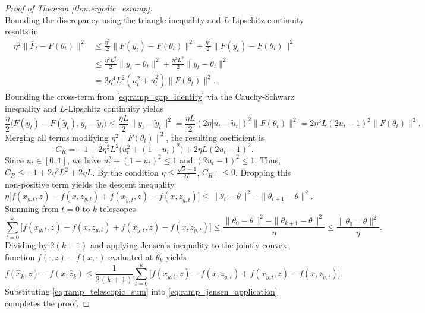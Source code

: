 \documentclass[letter,11pt]{article}
\begin{document}
\begin{proof}[Proof of Theorem \ref{thm:ergodic_esramp}]
\begin{equation}
\end{equation}
Bounding the discrepancy using the triangle inequality and $L$-Lipschitz continuity results in
\begin{equation}
\begin{aligned}
\eta^2 \|\bar{F}_t - F(\theta_t)\|^2 &\le \frac{\eta^2}{2}\|F(y_t) - F(\theta_t)\|^2 + \frac{\eta^2}{2}\|F(\tilde{y}_t) - F(\theta_t)\|^2 \\
&\le \frac{\eta^2 L^2}{2}\|y_t - \theta_t\|^2 + \frac{\eta^2 L^2}{2}\|\tilde{y}_t - \theta_t\|^2 \\
&= 2\eta^4 L^2 (u_t^2 + \tilde{u}_t^2) \|F(\theta_t)\|^2.
\end{aligned}
\end{equation}
Bounding the cross-term from \eqref{eq:ramp_gap_identity} via the Cauchy-Schwarz inequality and $L$-Lipschitz continuity yields
\begin{equation}
\frac{\eta}{2} \langle F(y_t) - F(\tilde{y}_t), y_t - \tilde{y}_t \rangle \le \frac{\eta L}{2} \|y_t - \tilde{y}_t\|^2 = \frac{\eta L}{2} (2\eta |u_t - \tilde{u}_t|)^2 \|F(\theta_t)\|^2 = 2\eta^3 L (2u_t - 1)^2 \|F(\theta_t)\|^2.
\end{equation}
Merging all terms modifying $\eta^2 \|F(\theta_t)\|^2$, the resulting coefficient is
\begin{equation}
C_{R} = -1 + 2\eta^2 L^2 \big(u_t^2 + (1-u_t)^2\big) + 2\eta L (2u_t - 1)^2.
\end{equation}
Since $u_t \in [0,1]$, we have $u_t^2 + (1-u_t)^2 \le 1$ and $(2u_t - 1)^2 \le 1$. Thus, $C_{R} \le -1 + 2\eta^2 L^2 + 2\eta L$. By the condition $\eta \le \frac{\sqrt{3}-1}{2L}$, $C_{R+} \le 0$. Dropping this non-positive term yields the descent inequality
\begin{equation} \label{eq:ramp_final_descent}
\eta \big[ f(x_{y,t}, z) - f(x, z_{y,t}) + f(x_{\tilde{y},t}, z) - f(x, z_{\tilde{y},t}) \big] \le \|\theta_t - \theta\|^2 - \|\theta_{t+1} - \theta\|^2.
\end{equation}
Summing from $t=0$ to $k$ telescopes
\begin{equation} \label{eq:ramp_telescopic_sum}
\sum_{t=0}^k \big[ f(x_{y,t}, z) - f(x, z_{y,t}) + f(x_{\tilde{y},t}, z) - f(x, z_{\tilde{y},t}) \big] \le \frac{\|\theta_0 - \theta\|^2 - \|\theta_{k+1} - \theta\|^2}{\eta} \le \frac{\|\theta_0 - \theta\|^2}{\eta}.
\end{equation}
Dividing by $2(k+1)$ and applying Jensen's inequality to the jointly convex function $f(\cdot, z) - f(x, \cdot)$ evaluated at $\hat{\theta}_k$ yields
\begin{equation} \label{eq:ramp_jensen_application}
f(\hat{x}_k, z) - f(x, \hat{z}_k) \le \frac{1}{2(k+1)} \sum_{t=0}^k \big[ f(x_{y,t}, z) - f(x, z_{y,t}) + f(x_{\tilde{y},t}, z) - f(x, z_{\tilde{y},t}) \big].
\end{equation}
Substituting \eqref{eq:ramp_telescopic_sum} into \eqref{eq:ramp_jensen_application} completes the proof.
\end{proof}
\end{document}
